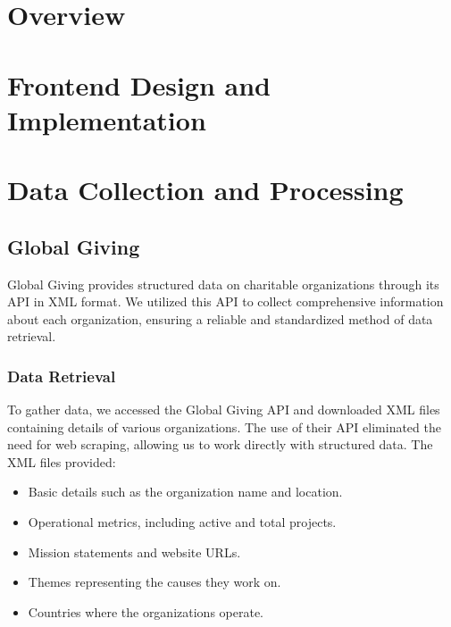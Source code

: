 \documentclass[unicode,9pt,a4paper,oneside,numbers=endperiod,openany]{scrartcl}
\begin{document}
\setassignment
{}

\newline

\section{Overview}

\section{Frontend Design and Implementation}

\section{Data Collection and Processing}

\subsection{Global Giving}
Global Giving provides structured data on charitable organizations through its API in XML format. We utilized this API to collect comprehensive information about each organization, ensuring a reliable and standardized method of data retrieval.

\subsubsection{Data Retrieval}
To gather data, we accessed the Global Giving API and downloaded XML files containing details of various organizations. The use of their API eliminated the need for web scraping, allowing us to work directly with structured data. The XML files provided:
\begin{itemize}
\item Basic details such as the organization name and location.
\item Operational metrics, including active and total projects.
\item Mission statements and website URLs.
\item Themes representing the causes they work on.
\item Countries where the organizations operate.
\end{itemize}
\end{document}
